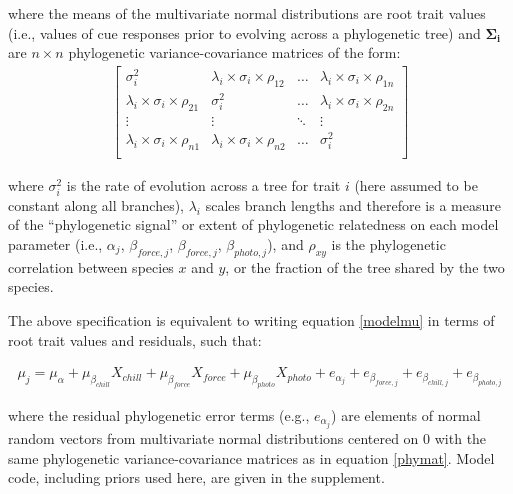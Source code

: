 \documentclass[11pt]{article}
\begin{document}
\noindent where the means of the multivariate normal distributions are root trait values (i.e., values of cue responses prior to evolving across a phylogenetic tree) and $\boldsymbol{\Sigma_i}$ %
are $n \times n$ phylogenetic variance-covariance matrices of the form: \\ 
\begin{align}
  \label{phymat}
\begin{bmatrix}
  \sigma^2_i & \lambda_i \times \sigma_{i} \times \rho_{12} & \ldots & \lambda_i \times \sigma_{i} \times \rho_{1n} \\
  \lambda_i \times \sigma_i \times \rho_{21} & \sigma^2_i & \ldots & \lambda_i \times \sigma_{i} \times \rho_{2n} \\
  \vdots & \vdots & \ddots & \vdots \\
  \lambda_i \times \sigma_i \times \rho_{n1} & \lambda_i \times \sigma_i \times \rho_{n2} & \ldots & \sigma^2_i \\
\end{bmatrix}
\end{align}

\noindent where $\sigma_i^2$ is the rate of evolution across a tree for trait $i$ (here assumed to be constant along all branches), $\lambda_i$ scales branch lengths and therefore is a measure of the ``phylogenetic signal'' or extent of phylogenetic relatedness on each model parameter (i.e., $\alpha_{j}$, $\beta_{force,j}$, $\beta_{force,j}$, $\beta_{photo,j}$), and $\rho_{xy}$ is the phylogenetic correlation between species $x$ and $y$, or the fraction of the tree shared by the two species.

The above specification is equivalent to writing equation \ref{modelmu} in terms of root trait values and residuals, such that:

\begin{align}
  \label{eqfive}
  \mu_j = \mu_\alpha + \mu_{\beta_{chill}} X_{chill} + \mu_{\beta_{force}} X_{force} + \mu_{\beta_{photo}} X_{photo} + e_{\alpha_{j}} + e_{\beta_{force,j}} + e_{\beta_{chill,j}} + e_{\beta_{photo,j}}
\end{align}

\noindent where the residual phylogenetic error terms (e.g., $e_{\alpha_{j}}$) are elements of normal random vectors from multivariate normal distributions centered on $0$ with the same phylogenetic variance-covariance matrices as in equation \ref{phymat}. Model code, including priors used here, are given in the supplement. 
\end{document}
